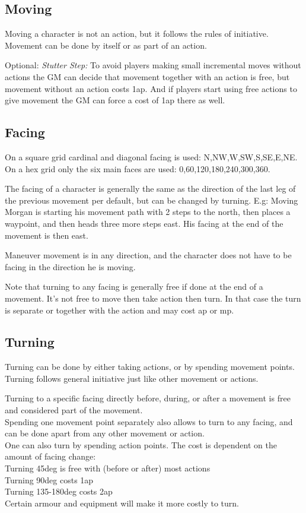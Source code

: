 \subsection*{Moving}
Moving a character is not an action, but it follows the rules of initiative. Movement can be done by itself or as part of an action.

Optional: \emph{Stutter Step:} To avoid players making small incremental moves without actions the GM can decide that movement together with an action is free, but movement without an action costs 1ap. And if players start using free actions to give movement the GM can force a cost of 1ap there as well.


\subsection*{Facing}
On a square grid cardinal and diagonal facing is used: N,NW,W,SW,S,SE,E,NE.
On a hex grid only the six main faces are used: 0,60,120,180,240,300,360.

The facing of a character is generally the same as the direction of the last leg of the previous movement per default, but can be changed by turning. E.g: Moving Morgan is starting his movement path with 2 steps to the north, then places a waypoint, and then heads three more steps east. His facing at the end of the movement is then east.

Maneuver movement is in any direction, and the character does not have to be facing in the direction he is moving.

Note that turning to any facing is generally free if done at the end of a movement. It's not free to move then take action then turn. In that case the turn is separate or together with the action and may cost ap or mp.


\subsection*{Turning}
Turning can be done by either taking actions, or by spending movement points. Turning follows general initiative just like other movement or actions.

Turning to a specific facing directly before, during, or after a movement is free and considered part of the movement. \\
Spending one movement point separately also allows to turn to any facing, and can be done apart from any other movement or action. \\
One can also turn by spending action points. The cost is dependent on the amount of facing change: \\
Turning 45deg is free with (before or after) most actions \\
Turning 90deg costs 1ap \\
Turning 135-180deg costs 2ap \\
Certain armour and equipment will make it more costly to turn.

